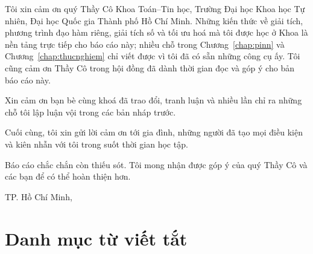 Tôi xin cảm ơn quý Thầy Cô Khoa Toán--Tin học, Trường Đại học Khoa học Tự nhiên,
Đại học Quốc gia Thành phố Hồ Chí Minh. Những kiến thức về giải tích, phương
trình đạo hàm riêng, giải tích số và tối ưu hoá mà tôi được học ở Khoa là nền
tảng trực tiếp cho báo cáo này; nhiều chỗ trong Chương~\ref{chap:pinn} và
Chương~\ref{chap:thucnghiem} chỉ viết được vì tôi đã có sẵn những công cụ ấy.
Tôi cũng cảm ơn Thầy Cô trong hội đồng đã dành thời gian đọc và góp ý cho bản
báo cáo này.

Xin cảm ơn bạn bè cùng khoá đã trao đổi, tranh luận và nhiều lần chỉ ra những
chỗ tôi lập luận vội trong các bản nháp trước.

Cuối cùng, tôi xin gửi lời cảm ơn tới gia đình, những người đã tạo mọi điều kiện
và kiên nhẫn với tôi trong suốt thời gian học tập.

Báo cáo chắc chắn còn thiếu sót. Tôi mong nhận được góp ý của quý Thầy Cô và
các bạn để có thể hoàn thiện hơn.

\vspace{1cm}
\begin{flushright}
\begin{minipage}{8.6cm}
\centering
TP. Hồ Chí Minh, \thesisDate\\[0.3cm]
\thesisAuthor
\end{minipage}
\end{flushright}

\chapter*{Danh mục từ viết tắt}

